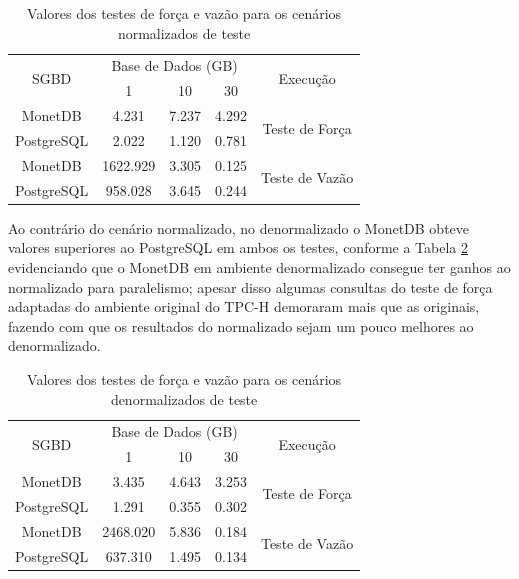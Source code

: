 \documentclass[12pt]{article}
\begin{document}
\begin{table}[htpb]
    \centering
    \caption{Valores dos testes de força e vazão para os cenários normalizados de teste}
    \label{tab:power-vazao-normalizado}
    \begin{tabular}{c|ccc|c}
    \hline
    \multirow{2}{*}{SGBD} & \multicolumn{3}{c|}{Base de Dados (GB)} & \multirow{2}{*}{Execução}       \\
                          & 1             & 10         & 30         &                                 \\ \hline
    MonetDB               & 4.231         & 7.237      & 4.292      & \multirow{2}{*}{Teste de Força} \\
    PostgreSQL            & 2.022         & 1.120      & 0.781      &                                 \\ \hline
    MonetDB               & 1622.929      & 3.305      & 0.125      & \multirow{2}{*}{Teste de Vazão} \\
    PostgreSQL            & 958.028       & 3.645      & 0.244      &                                 \\ \hline
    \end{tabular}
\end{table}

Ao contrário do cenário normalizado, no denormalizado o MonetDB obteve valores 
superiores ao PostgreSQL em ambos os testes, conforme a Tabela \ref{tab:power-vazao-denormalizado} 
evidenciando que o MonetDB em ambiente denormalizado consegue ter ganhos 
ao normalizado para paralelismo; apesar disso algumas consultas do teste de força 
adaptadas do ambiente original do TPC-H demoraram mais que as originais, fazendo com que 
os resultados do normalizado sejam um pouco melhores ao denormalizado.

\begin{table}[htpb]
    \centering
    \caption{Valores dos testes de força e vazão para os cenários denormalizados de teste}
    \label{tab:power-vazao-denormalizado}
    \begin{tabular}{c|ccc|c}
    \hline
    \multirow{2}{*}{SGBD} & \multicolumn{3}{c|}{Base de Dados (GB)} & \multirow{2}{*}{Execução}       \\
                          & 1             & 10         & 30         &                                 \\ \hline
    MonetDB               & 3.435         & 4.643      & 3.253      & \multirow{2}{*}{Teste de Força} \\
    PostgreSQL            & 1.291         & 0.355      & 0.302      &                                 \\ \hline
    MonetDB               & 2468.020      & 5.836      & 0.184      & \multirow{2}{*}{Teste de Vazão} \\
    PostgreSQL            & 637.310       & 1.495      & 0.134      &                                 \\ \hline
    \end{tabular}
    \end{table}
\end{document}
